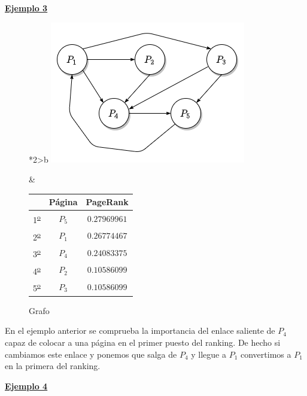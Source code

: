 \documentclass[size=a4, parskip=half, titlepage=false, toc=flat, toc=bib, 12pt]{scrartcl}
\theoremstyle{theorem-style}
\theoremstyle{definition-style}
\theoremstyle{remark-style}
\theoremstyle{example-style}
\theoremstyle{definition-style}
\theoremstyle{remark-style}
\begin{document}
\underline{\textbf{Ejemplo 3}}

\begin{figure}[!ht]
  \begin{tabular}{*{2}{>{\centering\arraybackslash}b{}}}
  \centering
    \includegraphics[scale=0.5]{./img/grafoej3}
    \caption{Grafo}
    &
      \renewcommand{\arraystretch}{1.3}
      \begin{tabular}{ccc}
        & Página & PageRank     \\ \hline
      1\textsuperscript{\underline{o}}} & $P_5$  & $0.27969961$ \\ \hline
      2\textsuperscript{\underline{o}}} & $P_1$  & $0.26774467$ \\ \hline
      3\textsuperscript{\underline{o}}} & $P_4$  & $0.24083375$ \\ \hline
      4\textsuperscript{\underline{o}}} & $P_2$  & $0.10586099$ \\ \hline
      5\textsuperscript{\underline{o}}} & $P_3$  & $0.10586099$ \\ \hline
      \end{tabular}
    \end{tabular}
\end{figure}

En el ejemplo anterior se comprueba la importancia del enlace saliente de $P_4$ capaz de colocar a una página en el primer puesto del ranking. De hecho si cambiamos este enlace y ponemos que salga de $P_4$ y llegue a $P_1$ convertimos a $P_1$ en la primera del ranking.

\underline{\textbf{Ejemplo 4}}
\end{document}
